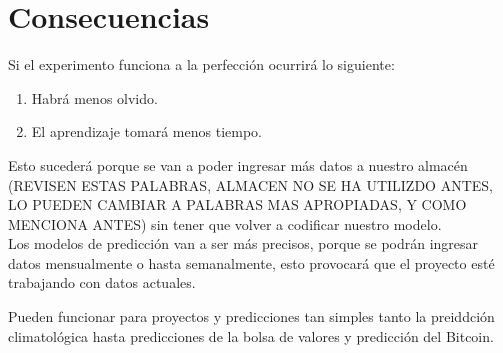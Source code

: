 \section{Consecuencias}

    Si el experimento funciona a la perfecci\'on ocurrir\'a lo siguiente:
    \begin{enumerate}
        \item Habrá menos olvido.
        \item El aprendizaje tomará menos tiempo.
    \end{enumerate}

    Esto sucederá porque se van a poder ingresar m\'as datos a nuestro almacén (REVISEN ESTAS PALABRAS, ALMACEN NO 
    SE HA UTILIZDO ANTES, LO PUEDEN CAMBIAR A PALABRAS MAS APROPIADAS, Y COMO MENCIONA ANTES) sin 
    tener que volver a codificar nuestro modelo.\\
    Los modelos de predicci\'on van a ser m\'as precisos, porque se podrán ingresar 
    datos mensualmente o hasta semanalmente, esto provocar\'a que el proyecto est\'e trabajando 
    con datos actuales.

    Pueden funcionar para proyectos y predicciones tan simples tanto la preiddci\'on climatol\'ogica
    hasta predicciones de la bolsa de valores y predicci\'on del Bitcoin.
